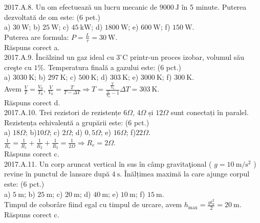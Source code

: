 2017.A.8. Un om efectuează un lucru mecanic de $9000 \mathrm{~J}$ în 5 minute. Puterea dezvoltată de om este: (6 pet.)\\ a) $30 \mathrm{~W}$; b) $25 \mathrm{~W}$; c) $45 \mathrm{~kW}$; d) $1800 \mathrm{~W}$; e) $600 \mathrm{~W}$; f) $150 \mathrm{~W}$.\\ Puterea are formula: $P=\frac{L}{\tau}=30 \mathrm{~W}$.\\ Răspuns corect a.\\

2017.A.9. Încălzind un gaz ideal cu $3^{\circ} \mathrm{C}$ printr-un proces izobar, volumul său creşte cu $1 \%$. Temperatura finală a gazului este: (6 pct.)\\ a) $3030 \mathrm{~K}$; b) $297 \mathrm{~K}$; c) $500 \mathrm{~K}$; d) $303 \mathrm{~K}$; e) $3000 \mathrm{~K}$; f) $300 \mathrm{~K}$.\\ Avem $\frac{V}{T}=\frac{V_{0}}{T_{0}}$, $\frac{V}{V_{0}}=\frac{T}{T-\Delta T} \Rightarrow T=\frac{\frac{V}{V_{0}}}{\frac{V}{V_{0}}-1} \Delta T=303 \mathrm{~K}$.\\ Răspuns corect d.\\

2017.A.10. Trei rezistori de rezistențe $6 \Omega$, $4 \Omega$ și $12 \Omega$ sunt conectați în paralel. Rezistența echivalentă a grupării este: (6 pct.)\\ a) $18 \Omega$; b)$10 \Omega$; c) $2 \Omega$; d) $0,5 \Omega$; e) $16 \Omega$; f)$22 \Omega$.\\ $\frac{1}{R_{e}}=\frac{1}{R_{1}}+\frac{1}{R_{2}}+\frac{1}{R_{3}}=\frac{1}{2 \Omega} \Rightarrow R_{e}=2 \Omega$.\\ Răspuns corect c.\\

2017.A.11. Un corp aruncat vertical în sus în câmp gravitaţional ( $g=10 \mathrm{~m} / \mathrm{s}^{2}$ ) revine în punctul de lansare după $4 \mathrm{~s}$. Înălțimea maximă la care ajunge corpul este: (6 pct.)\\ a) $5 \mathrm{~m}$; b) $25 \mathrm{~m}$; c) $20 \mathrm{~m}$; d) $40 \mathrm{~m}$; e) $10 \mathrm{~m}$; f) $15 \mathrm{~m}$.\\ Timpul de coborâre fiind egal cu timpul de urcare, avem $h_{\max}=\frac{g t_{u}^{2}}{2}=20 \mathrm{~m}$.\\ Răspuns corect c.\\

